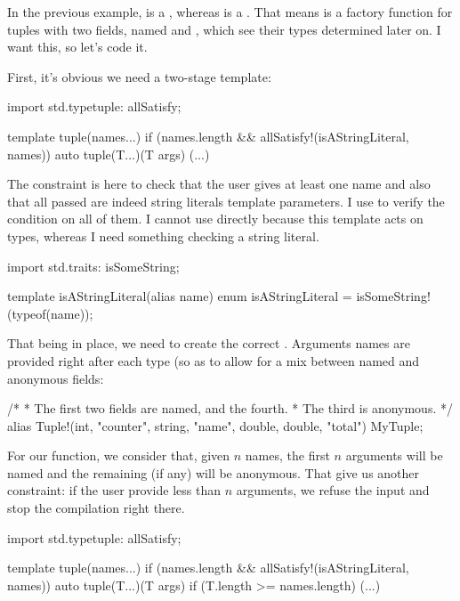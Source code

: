 In the previous example,  is a \DD{,}\DD{)}, whereas  is a \DD{,}\DD{)}. That means  is a factory function for tuples with two fields, named  and , which see their types determined later on. I want this, so let's code it.

First, it's obvious we need a two-stage template:

\begin{dcode}
import std.typetuple: allSatisfy;

template tuple(names...) 
if (names.length && allSatisfy!(isAStringLiteral, names))
{
    auto tuple(T...)(T args)
    {
    (...)
    }
}
\end{dcode}

The constraint is here to check that the user gives at least one name and also that all passed  are indeed string literals template parameters. I use  to verify the condition on all of them. I cannot use directly  because this template acts on types, whereas I need something checking a string literal.

\begin{dcode}
import std.traits: isSomeString;

template isAStringLiteral(alias name)
{
    enum isAStringLiteral = isSomeString!(typeof(name));
}
\end{dcode}

That being in place, we need to create the correct . Arguments names are provided right after each type (so as to allow for a mix between named and anonymous fields:

\begin{dcode}
/*
 * The first two fields are named, and the fourth.
 * The third is anonymous.
 */
alias Tuple!(int, "counter", string, "name", double, double, "total") MyTuple;
\end{dcode}

For our function, we consider that, given $n$ names, the first $n$ arguments will be named and the remaining (if any) will be anonymous. That give us another constraint: if the user provide less than $n$ arguments, we refuse the input and stop the compilation right there.

\begin{dcode}
import std.typetuple: allSatisfy;

template tuple(names...) 
if (names.length && allSatisfy!(isAStringLiteral, names))
{
    auto tuple(T...)(T args) if (T.length >= names.length)
    {
    (...)
    }
}
\end{dcode}

